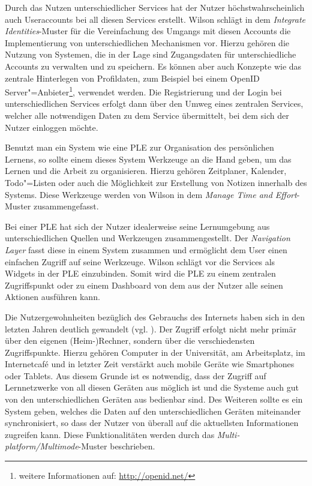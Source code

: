 Durch das Nutzen unterschiedlicher Services hat der Nutzer höchstwahrscheinlich auch Useraccounts bei all diesen Services erstellt. Wilson schlägt in dem \emph{Integrate Identities}-Muster für die Vereinfachung des Umgangs mit diesen Accounts die Implementierung von unterschiedlichen Mechanismen vor. Hierzu gehören die Nutzung von Systemen, die in der Lage sind Zugangsdaten für unterschiedliche Accounts zu verwalten und zu speichern. Es können aber auch Konzepte wie das zentrale Hinterlegen von Profildaten, zum Beispiel bei einem OpenID Server"=Anbieter\footnote{weitere Informationen auf: \url{http://openid.net/}}, verwendet werden. Die Registrierung und der Login bei unterschiedlichen Services erfolgt dann über den Umweg eines zentralen Services, welcher alle notwendigen Daten zu dem Service übermittelt, bei dem sich der Nutzer einloggen möchte.  

Benutzt man ein System wie eine \ac{PLE} zur Organisation des persönlichen Lernens, so sollte einem dieses System Werkzeuge an die Hand geben, um das Lernen und die Arbeit zu organisieren. Hierzu gehören Zeitplaner, Kalender, Todo"=Listen oder auch die Möglichkeit zur Erstellung von Notizen innerhalb des Systems. Diese Werkzeuge werden von Wilson in dem \emph{Manage Time and Effort}-Muster zusammengefasst.

Bei einer \ac{PLE} hat sich der Nutzer idealerweise seine Lernumgebung aus unterschiedlichen Quellen und Werkzeugen zusammengestellt. Der \emph{Navigation Layer} fasst diese in einem System zusammen und ermöglicht dem User einen einfachen Zugriff auf seine Werkzeuge. Wilson schlägt vor die Services als Widgets in der \ac{PLE} einzubinden. Somit wird die \ac{PLE} zu einem zentralen Zugriffspunkt oder zu einem Dashboard von dem aus der Nutzer alle seinen Aktionen ausführen kann. 

Die Nutzergewohnheiten bezüglich des Gebrauchs des Internets haben sich in den letzten Jahren deutlich gewandelt (vgl. \cite{VanHarmelen}). Der Zugriff erfolgt nicht mehr primär über den eigenen (Heim-)Rechner, sondern über die verschiedensten Zugriffspunkte. Hierzu gehören Computer in der Universität, am Arbeitsplatz, im Internetcafé und in letzter Zeit verstärkt auch mobile Geräte wie Smartphones oder Tablets. Aus diesem Grunde ist es notwendig, dass der Zugriff auf Lernnetzwerke von all diesen Geräten aus möglich ist und die Systeme auch gut von den unterschiedlichen Geräten aus bedienbar sind. Des Weiteren sollte es ein System geben, welches die Daten auf den unterschiedlichen Geräten miteinander synchronisiert, so dass der Nutzer von überall auf die aktuellsten Informationen zugreifen kann. Diese Funktionalitäten werden durch das \emph{Multi-platform/Multimode}-Muster beschrieben.

